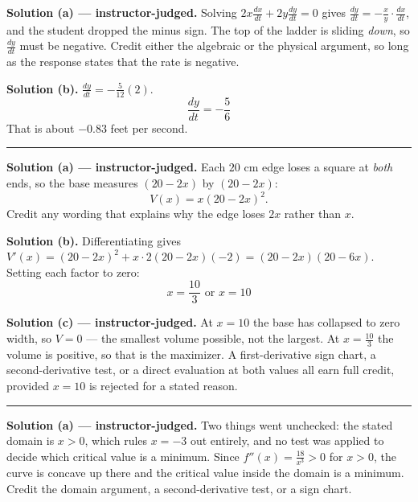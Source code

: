 \documentclass[12pt]{article}
\begin{document}

\textbf{Solution (a) --- instructor-judged.} Solving
$2x\frac{dx}{dt} + 2y\frac{dy}{dt} = 0$ gives
$\frac{dy}{dt} = -\frac{x}{y}\cdot\frac{dx}{dt}$, and the student dropped the
minus sign. The top of the ladder is sliding \emph{down}, so $\frac{dy}{dt}$
must be negative. Credit either the algebraic or the physical argument, so long
as the response states that the rate is negative.

\textbf{Solution (b).} $\frac{dy}{dt} = -\frac{5}{12}(2)$.
\[ \boxed{\frac{dy}{dt} = -\frac{5}{6}} \]
That is about $-0.83$ feet per second.

\vspace{0.2cm}\noindent\rule{\linewidth}{0.2pt}


\textbf{Solution (a) --- instructor-judged.} Each $20$ cm edge loses a square at
\emph{both} ends, so the base measures $(20 - 2x)$ by $(20 - 2x)$:
\[ V(x) = x(20 - 2x)^2 . \]
Credit any wording that explains why the edge loses $2x$ rather than $x$.

\textbf{Solution (b).} Differentiating gives
$V'(x) = (20-2x)^2 + x\cdot 2(20-2x)(-2) = (20-2x)(20-6x)$. Setting each factor
to zero:
\[ \boxed{x = \frac{10}{3} \text{ or } x = 10} \]

\textbf{Solution (c) --- instructor-judged.} At $x = 10$ the base has collapsed
to zero width, so $V = 0$ --- the smallest volume possible, not the largest. At
$x = \frac{10}{3}$ the volume is positive, so that is the maximizer. A
first-derivative sign chart, a second-derivative test, or a direct evaluation at
both values all earn full credit, provided $x = 10$ is rejected for a stated
reason.

\vspace{0.2cm}\noindent\rule{\linewidth}{0.2pt}


\textbf{Solution (a) --- instructor-judged.} Two things went unchecked: the
stated domain is $x > 0$, which rules $x = -3$ out entirely, and no test was
applied to decide which critical value is a minimum. Since
$f''(x) = \frac{18}{x^3} > 0$ for $x > 0$, the curve is concave up there and the
critical value inside the domain is a minimum. Credit the domain argument, a
second-derivative test, or a sign chart.
\end{document}
